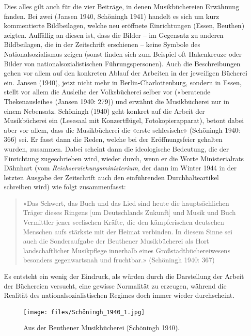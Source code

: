 \documentclass[a4paper,
fontsize=11pt,
oneside,
numbers=noperiodatend,
parskip=half-,
bibliography=totoc,
final
]{scrartcl}
\begin{document}
Dies alles gilt auch für die vier Beiträge, in denen Musikbüchereien
Erwähnung fanden. Bei zwei (Jansen 1940, Schöningh 1941) handelt es sich
um kurz kommentierte Bildbeilagen, welche neu eröffnete Einrichtungen
(Essen, Beuthen) zeigten. Auffällig an diesen ist, dass die Bilder -- im
Gegensatz zu anderen Bildbeilagen, die in der Zeitschrift erschienen --
keine Symbole des Nationalsozialismus zeigen (sonst finden sich zum
Beispiel oft Hakenkreuze oder Bilder von nationalsozialistischen
Führungspersonen). Auch die Beschreibungen gehen vor allem auf den
konkreten Ablauf der Arbeiten in der jeweiligen Bücherei ein. Jansen
(1940), jetzt nicht mehr in Berlin-Charlottenburg, sondern in Essen,
stellt vor allem die Ausleihe der Volksbücherei selber vor («beratende
Thekenausleihe» (Jansen 1940: 279)) und erwähnt die Musikbücherei nur in
einem Nebensatz. Schöningh (1940) geht konkret auf die Arbeit der
Musikbücherei ein (Lesesaal mit Konzertflügel, Fotokopierapparat),
betont dabei aber vor allem, dass die Musikbücherei die «erste
schlesische» (Schöningh 1940: 366) sei. Er fasst dann die Reden, welche
bei der Eröffnungsfeier gehalten wurden, zusammen. Dabei scheint dann
die ideologische Bedeutung, die der Einrichtung zugeschrieben wird,
wieder durch, wenn er die Worte Ministerialrats Dähnhart (vom
\emph{Reichserziehungsministerium}, der dann im Winter 1944 in der
letzten Ausgabe der Zeitschrift auch den einführenden Durchhalteartikel
schreiben wird) wie folgt zusammenfasst:

\begin{quote}
«Das Schwert, das Buch und das Lied sind heute die hauptsächlichen
Träger dieses Ringens {[}um Deutschlands Zukunft{]} und Musik und Buch
Vermittler jener seelischen Kräfte, die den kämpferischen deutschen
Menschen aufs stärkste mit der Heimat verbinden. In diesem Sinne sei
auch die Sonderaufgabe der Beuthener Musikbücherei als Hort
landschaftlicher Musikpflege innerhalb eines Großstadtbüchereiwesens
besonders gegenwartsnah und fruchtbar.» (Schöningh 1940: 367)
\end{quote}

Es entsteht ein wenig der Eindruck, als würden durch die Darstellung der
Arbeit der Büchereien versucht, eine gewisse Normalität zu erzeugen,
während die Realität des nationalsozialistischen Regimes doch immer
wieder durchscheint.

\begin{figure}
\centering
\texttt{[image: files/Schöningh\_1940\_1.jpg]}
\caption{Aus der Beuthener Musikbücherei (Schöningh 1940).}
\end{figure}
\end{document}
